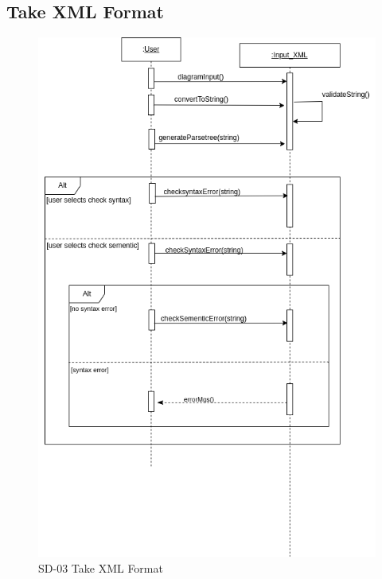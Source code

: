 \documentclass[12pt,a4paper]{article}
\begin{document}
\newpage
\subsection{Take XML Format}
\begin{figure}[h]
 \centering
\includegraphics[scale=0.55]{Diagram/Take XML errors-checking errors-checking errors.drawio.png}
\caption{SD-03 Take XML Format}
\end{figure}
\newpage
\end{document}
